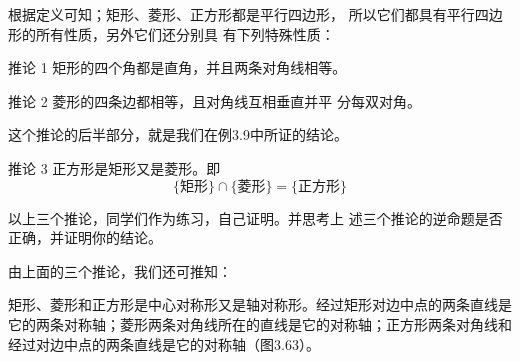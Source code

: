 根据定义可知；矩形、菱形、正方形都是平行四边形，
所以它们都具有平行四边形的所有性质，另外它们还分别具
有下列特殊性质：

\begin{Deduction}{推论 1} 矩形的四个角都是直角，并且两条对角线相等。
\end{Deduction}

\begin{Deduction}{推论 2} 菱形的四条边都相等，且对角线互相垂直并平
分每双对角。
\end{Deduction}

这个推论的后半部分，就是我们在例3.9中所证的结论。

\begin{Deduction}{推论 3} 正方形是矩形又是菱形。即
\[\{\text{矩形}\}\cap \{\text{菱形}\}=\{\text{正方形}\}\]
\end{Deduction}

以上三个推论，同学们作为练习，自己证明。并思考上
述三个推论的逆命题是否正确，并证明你的结论。

由上面的三个推论，我们还可推知：

矩形、菱形和正方形是中心对称形又是轴对称形。经过矩形对边中点的两条直线是它的两条对称轴；菱形两条对角线所在的直线是它的对称轴；正方形两条对角线和经过对边中点的两条直线是它的对称轴（图3.63）。

\begin{figure}
    \centering
\begin{tikzpicture}[scale=.8]
\end{tikzpicture}
    \caption{}
\end{figure}

